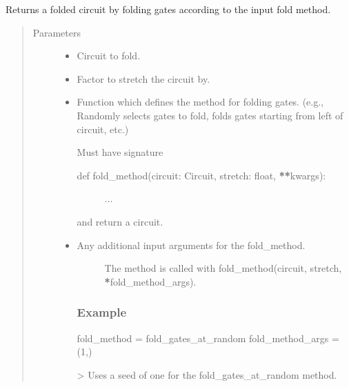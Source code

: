 \documentclass[letterpaper,10pt,english]{sphinxmanual}
\begin{document}
\begin{fulllineitems}
\label{\detokenize{apidoc:mitiq.folding_cirq.fold_local}}
Returns a folded circuit by folding gates according to the input fold method.
\begin{quote}\begin{description}
\item[{Parameters}] \leavevmode\begin{itemize}
\item {} 
 \sphinxhyphen{}\sphinxhyphen{} Circuit to fold.

\item {} 
 \sphinxhyphen{}\sphinxhyphen{} Factor to stretch the circuit by.

\item {} 
 \sphinxhyphen{}\sphinxhyphen{} 
Function which defines the method for folding gates.
(e.g., Randomly selects gates to fold, folds gates starting from left of circuit, etc.)

Must have signature
\begin{description}
\item[{def fold\_method(circuit: Circuit, stretch: float, {\color{red}\bfseries{}**}kwargs):}] \leavevmode
...

\end{description}

and return a circuit.


\item {} 
 \sphinxhyphen{}\sphinxhyphen{} \begin{description}
\item[{Any additional input arguments for the fold\_method.}] \leavevmode
The method is called with fold\_method(circuit, stretch, {\color{red}\bfseries{}*}fold\_method\_args).

\end{description}
\subsubsection*{Example}

fold\_method = fold\_gates\_at\_random
fold\_method\_args = (1,)

\textgreater{} Uses a seed of one for the fold\_gates\_at\_random method.


\end{itemize}

\end{description}\end{quote}

\end{fulllineitems}
\end{document}
